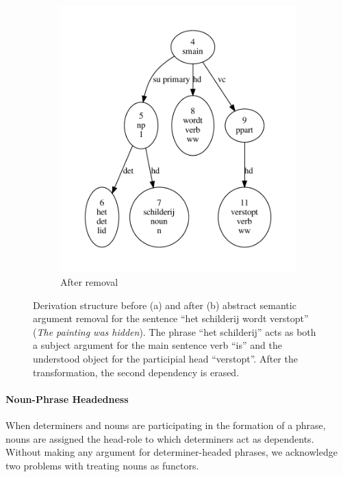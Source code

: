 \begin{figure}[t]
\begin{subfigure}[t]{0.49\textwidth}
        \includegraphics[scale=0.49]{Figures/abs2.pdf}
        \caption{After removal}
    \end{subfigure}\vfill
    \caption[Abstract Semantic Argument Removal]{Derivation structure before (a) and after (b) abstract semantic argument removal for the sentence ``het schilderij wordt verstopt'' (\textit{The painting was hidden}). The phrase ``het schilderij'' acts as both a subject argument for the main sentence verb ``is'' and the understood object for the participial head ``verstopt''. After the transformation, the second dependency is erased.}
    \label{fig:abstract_arg}
\end{figure}

\paragraph{Noun-Phrase Headedness}
When determiners and nouns are participating in the formation of a phrase, nouns are assigned the head-role to which determiners act as dependents.
Without making any argument for determiner-headed phrases, we acknowledge two problems with treating nouns as functors.


